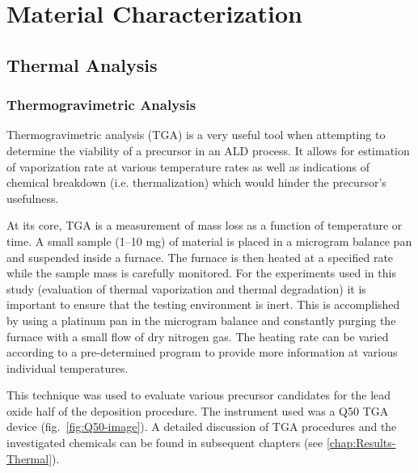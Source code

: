\chapter{Material Characterization}
\label{chap:Charact}
\thispagestyle{empty}


\section{Thermal Analysis}
\label{sec:Charact-Thermal}


\subsection{Thermogravimetric Analysis}

Thermogravimetric analysis (TGA) is a very useful tool when attempting to determine the viability of a precursor in an ALD process. It allows for estimation of vaporization rate at various temperature rates as well as indications of chemical breakdown (i.e. thermalization) which would hinder the precursor's usefulness. 

At its core, TGA is a measurement of mass loss as a function of temperature or time. A small sample (1--10 mg) of material is placed in a microgram balance pan and suspended inside a furnace. The furnace is then heated at a specified rate while the sample mass is carefully monitored. For the experiments used in this study (evaluation of thermal vaporization and thermal degradation) it is important to ensure that the testing environment is inert. This is accomplished by using a platinum pan in the microgram balance and constantly purging the furnace with a small flow of dry nitrogen gas. The heating rate can be varied according to a pre-determined program to provide more information at various individual temperatures. 

This technique was used to evaluate various precursor candidates for the lead oxide half of the \PTO{} deposition procedure. The instrument used was a Q50 TGA device (fig.~\vref{fig:Q50-image}).  A detailed discussion of TGA procedures and the investigated chemicals can be found in subsequent chapters (see \vref{chap:Results-Thermal}). 

